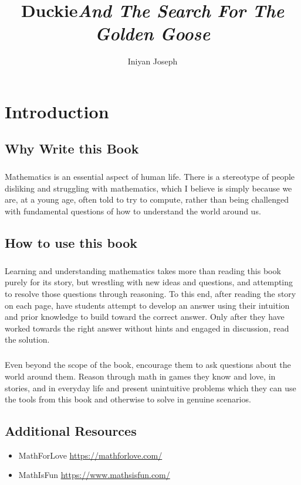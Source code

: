\documentclass[a4paper,11pt,standalone]{book}
\title{\textbf{Duckie}\linebreak \textit{And The Search For The Golden Goose}}
\date{}
\author{Iniyan Joseph}
\begin{document}
\maketitle
\chapter*{Introduction}     
\section*{Why Write this Book}

\paragraph*{} Mathematics is an essential aspect of human life. There is a stereotype of people disliking and struggling with mathematics, which I believe is simply because we are, at a young age, often told to try to compute, rather than being challenged with fundamental questions of how to understand the world around us. 
\section*{How to use this book}
\paragraph*{} Learning and understanding mathematics takes more than reading this book purely for its story, but wrestling with new ideas and questions, and attempting to resolve those questions through reasoning. To this end, after reading the story on each page, have students attempt to develop an answer using their intuition and prior knowledge to build toward the correct answer. Only after they have worked towards the right answer without hints and engaged in discussion, read the solution.
\paragraph{} Even beyond the scope of the book, encourage them to ask questions about the world around them. Reason through math in games they know and love, in stories, and in everyday life and present unintuitive problems which they can use the tools from this book and otherwise to solve in genuine scenarios. 
\section*{Additional Resources} 
\begin{itemize}
\item MathForLove \url{https://mathforlove.com/}
\item MathIsFun \url{https://www.mathsisfun.com/}
\end{itemize}
\end{document}
